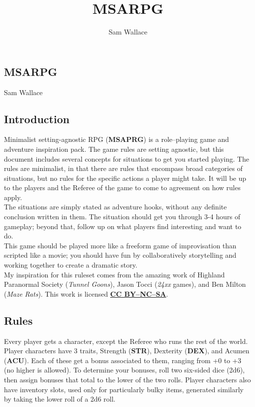 \documentclass[landscape]{book}
\title{MSARPG}
\author{Sam Wallace}
\begin{document}
\begin{multicols*}{4}
\chapter*{MSARPG}

Sam Wallace

\section*{Introduction}
Minimalist setting-agnostic RPG (\textbf{MSAPRG}) is a role--playing game and adventure inspiration pack.
The game rules are setting agnostic, but this document includes several concepts for situations to get you started playing.
The rules are minimalist, in that there are rules that encompass broad categories of situations, but no rules for the specific actions a player might take.
It will be up to the players and the Referee of the game to come to agreement on how rules apply. \\

The situations are simply stated as adventure hooks, without any definite conclusion written in them.
The situation should get you through 3-4 hours of gameplay; beyond that, follow up on what players find interesting and want to do. \\

This game should be played more like a freeform game of improvisation than scripted like a movie; you should have fun by collaboratively storytelling and working together to create a dramatic story. \\

My inspiration for this ruleset comes from the amazing work of Highland Paranormal Society (\emph{Tunnel Goons}), Jason Tocci (\emph{24xx} games), and Ben Milton (\emph{Maze Rats}). This work is licensed \href{https://creativecommons.org/licenses/by-nc-sa/4.0/legalcode}{\textbf{CC BY--NC--SA}}.
\section*{Rules}
Every player gets a character, except the Referee who runs the rest of the world.
Player characters have 3 traits, Strength (\textbf{STR}), Dexterity (\textbf{DEX}), and Acumen (\textbf{ACU}).
Each of these get a bonus associated to them, ranging from +0 to +3 (no higher is allowed).
To determine your bonuses, roll two six-sided dice (2d6), then assign bonuses that total to the lower of the two rolls. 
Player characters also have inventory slots, used only for particularly bulky items, generated similarly by taking the lower roll of a 2d6 roll. \\


\end{multicols*}
\end{document}
